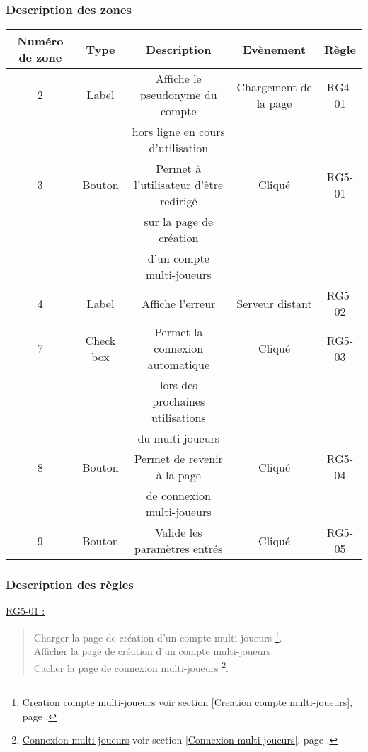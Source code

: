 \documentclass{report}
\begin{document}
		\subsubsection{Description des zones}
		
			\begin{tabular}{|c|c|c|c|c|} \hline
				Numéro de zone & Type  & Description & Evènement &	Règle \\\hline
				2 & Label & Affiche le pseudonyme du compte & Chargement de la page & RG4-01 \\
				  &       & hors ligne en cours d'utilisation & & \\\hline
				3 & Bouton & Permet à l'utilisateur d'être redirigé & Cliqué & RG5-01\\
				  &        & sur la page de création  & & \\
				  &        & d'un compte multi-joueurs \footnotemark[1] & & \\\hline
				4 & Label & Affiche l'erreur & Serveur distant & RG5-02 \\\hline
				7 & Check box & Permet la connexion automatique & Cliqué & RG5-03 \\
				  &           & lors des prochaines utilisations&        & \\				
				  &           & du multi-joueurs                &        & \\\hline
				8 & Bouton & Permet de revenir à la page & Cliqué & RG5-04 \\
				  &        & de connexion multi-joueurs \footnotemark[2] & & \\\hline
				9 & Bouton & Valide les paramètres entrés & Cliqué & RG5-05 \\\hline
			\end{tabular}
			
		\subsubsection{Description des règles}

			\underline{RG5-01 :}
				\begin{quote}
					Charger la page de création d'un compte multi-joueurs%
						\footnote[1]{
							\hyperlink{Creation compte multi-joueurs}{Creation compte multi-joueurs}
							\og voir section \ref{Creation compte multi-joueurs}, page \pageref{Creation compte multi-joueurs}.\fg
						}.\\
					Afficher la page de création d'un compte multi-joueurs\footnotemark[1].\\
					Cacher la page de connexion multi-joueurs%
						\footnote[2]{
							\hyperlink{Connexion multi-joueurs}{Connexion multi-joueurs}
							\og voir section \ref{Connexion multi-joueurs}, page \pageref{Connexion multi-joueurs}.\fg
						}.\\
				\end{quote}	
				
\end{document}
